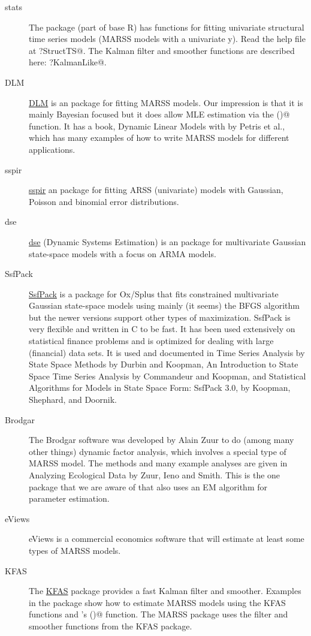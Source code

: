 \begin{description}
  \item[stats] The \verb@stats@ package (part of base R) has functions for fitting univariate structural time series models (MARSS models with a univariate y).  Read the help file at \verb@?StructTS@. The Kalman filter and smoother functions are described here: \verb@?KalmanLike@.
	\item[DLM] \href{http://cran.r-project.org/web/packages/dlm/index.html}{DLM} is an \R package for fitting MARSS models.  Our impression is that it is mainly Bayesian focused but it does allow MLE estimation via the \verb@optim()@ function.  It has a book, Dynamic Linear Models with \R  by Petris et al., which has many examples of how to write MARSS models for different applications.
	\item[sspir] \href{http://cran.r-project.org/web/packages/sspir/index.html}{sspir} an \R package for fitting ARSS (univariate) models with Gaussian, Poisson and binomial error distributions.  
	\item[dse] \href{http://cran.r-project.org/web/packages/dse/index.html}{dse} (Dynamic Systems Estimation) is an \R package for multivariate Gaussian state-space models with a focus on ARMA models.
	\item[SsfPack] \href{http://www.ssfpack.com/}{SsfPack} is a package for Ox/Splus that fits constrained multivariate Gaussian state-space models using mainly (it seems) the BFGS algorithm but the newer versions support other types of maximization.  SsfPack is very flexible and written in C to be fast.  It has been used extensively on statistical finance problems and is optimized for dealing with large (financial) data sets.  It is used and documented in Time Series Analysis by State Space Methods by Durbin and Koopman, An Introduction to State Space Time Series Analysis by Commandeur and Koopman, and Statistical Algorithms for Models in State Space Form: SsfPack 3.0, by Koopman, Shephard, and Doornik.
	\item[Brodgar] The Brodgar software was developed by Alain Zuur to do (among many other things) dynamic factor analysis, which involves a special type of MARSS model.  The methods and many example analyses are given in Analyzing Ecological Data by Zuur, Ieno and Smith.  This is the one package that we are aware of that also uses an EM algorithm for parameter estimation.
	\item[eViews] eViews is a commercial economics software that will estimate at least some types of MARSS models.
	\item[KFAS] The \href{http://cran.r-project.org/web/packages/KFAS/index.html}{KFAS} \R package provides a fast Kalman filter and smoother.  Examples in the package show how to estimate MARSS models using the KFAS functions and \R's \verb@optim()@ function.   The MARSS package uses the filter and smoother functions from the KFAS package.

\end{description}
